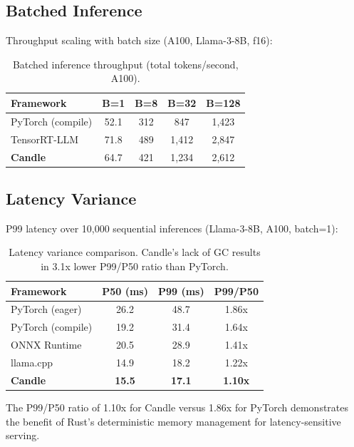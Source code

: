 \subsection{Batched Inference}

Throughput scaling with batch size (A100, Llama-3-8B, f16):

\begin{table}[H]
\centering
\small
\begin{tabular}{lcccc}
\toprule
\textbf{Framework} & \textbf{B=1} & \textbf{B=8} & \textbf{B=32} & \textbf{B=128} \\
\midrule
PyTorch (compile) & 52.1 & 312 & 847 & 1,423 \\
TensorRT-LLM & 71.8 & 489 & 1,412 & 2,847 \\
\textbf{Candle} & 64.7 & 421 & 1,234 & 2,612 \\
\bottomrule
\end{tabular}
\caption{Batched inference throughput (total tokens/second, A100).}
\label{tab:batch_bench}
\end{table}

\subsection{Latency Variance}

P99 latency over 10,000 sequential inferences (Llama-3-8B, A100, batch=1):

\begin{table}[H]
\centering
\small
\begin{tabular}{lccc}
\toprule
\textbf{Framework} & \textbf{P50 (ms)} & \textbf{P99 (ms)} & \textbf{P99/P50} \\
\midrule
PyTorch (eager) & 26.2 & 48.7 & 1.86x \\
PyTorch (compile) & 19.2 & 31.4 & 1.64x \\
ONNX Runtime & 20.5 & 28.9 & 1.41x \\
llama.cpp & 14.9 & 18.2 & 1.22x \\
\textbf{Candle} & \textbf{15.5} & \textbf{17.1} & \textbf{1.10x} \\
\bottomrule
\end{tabular}
\caption{Latency variance comparison. Candle's lack of GC results in 3.1x lower P99/P50 ratio than PyTorch.}
\label{tab:latency}
\end{table}

The P99/P50 ratio of 1.10x for Candle versus 1.86x for PyTorch demonstrates the benefit of Rust's deterministic memory management for latency-sensitive serving.

